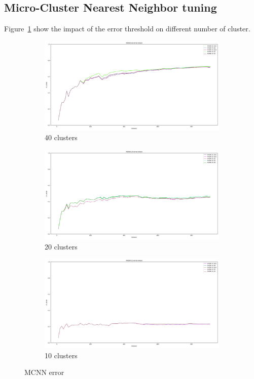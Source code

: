 \subsection{Micro-Cluster Nearest Neighbor tuning}
Figure~\ref{fig:mcnn-tuning-error} show the impact of the error threshold on different number of cluster.
\begin{figure}[H]
     \begin{subfigure}[b]{0.49\textwidth}
         \centering
		 \includegraphics[width=\linewidth]{figures/Banos_S1_shuf_MCNN_40_error_check.png}
         \caption{40 clusters}
     \end{subfigure}
     \begin{subfigure}[b]{0.49\textwidth}
         \centering
		 \includegraphics[width=\linewidth]{figures/Banos_S1_shuf_MCNN_20_error_check.png}
         \caption{20 clusters}
     \end{subfigure}
     \begin{subfigure}[b]{0.49\textwidth}
         \centering
		 \includegraphics[width=\linewidth]{figures/Banos_S1_shuf_MCNN_10_error_check.png}
         \caption{10 clusters}
     \end{subfigure}
	\caption{MCNN error}
	\label{fig:mcnn-tuning-error}
\end{figure}

